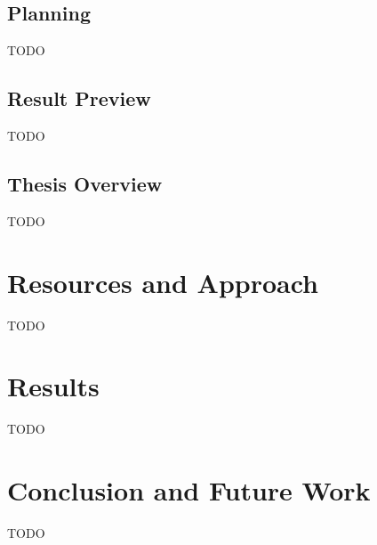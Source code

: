 \documentclass[12pt]{article}
\begin{document}
	\subsection{Planning}
	TODO
	\subsection{Result Preview}
	TODO
	\subsection{Thesis Overview}
	TODO	
	\section{Resources and Approach}
	TODO
	\section{Results}
	TODO
	\section{Conclusion and Future Work}
	TODO

\end{document}
